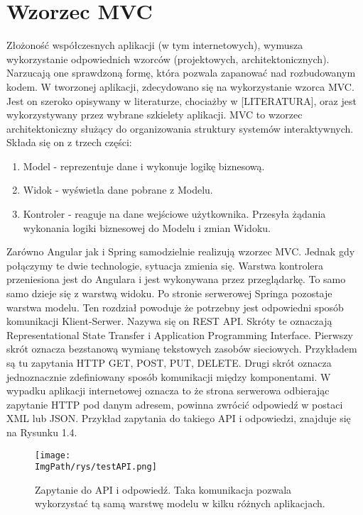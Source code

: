\documentclass[a4paper,12pt,twoside,openany]{report}
\newcommand{\ImgPath}{.}
\begin{document}
\section{Wzorzec MVC}
Złożoność współczesnych aplikacji (w tym internetowych), wymusza wykorzystanie odpowiednich wzorców (projektowych, architektonicznych). Narzucają one sprawdzoną formę, która pozwala zapanować nad rozbudowanym kodem. W tworzonej aplikacji, zdecydowano się na wykorzystanie wzorca MVC. Jest on szeroko opisywany w literaturze, chociażby w [LITERATURA], oraz jest wykorzystywany przez wybrane szkielety aplikacji. MVC to wzorzec architektoniczny służący do organizowania struktury systemów interaktywnych. Składa się on z trzech części:
	\begin{enumerate}
		\item Model - reprezentuje dane i wykonuje logikę biznesową.
		\item Widok - wyświetla dane pobrane z Modelu.
		\item Kontroler - reaguje na dane wejściowe użytkownika. Przesyła żądania wykonania logiki biznesowej do Modelu i zmian Widoku. 
	\end{enumerate}
Zarówno Angular jak i Spring samodzielnie realizują wzorzec MVC. Jednak gdy połączymy te dwie technologie, sytuacja zmienia się. Warstwa kontrolera przeniesiona jest do Angulara i jest wykonywana przez przeglądarkę. To samo samo dzieje się z warstwą widoku. Po stronie serwerowej Springa pozostaje warstwa modelu. Ten rozdział powoduje że potrzebny jest odpowiedni sposób komunikacji Klient-Serwer. Nazywa się on REST API. Skróty te oznaczają Representational State Transfer i Application Programming Interface. Pierwszy skrót oznacza bezstanową wymianę tekstowych zasobów sieciowych. Przykładem są tu zapytania HTTP GET, POST, PUT, DELETE. Drugi skrót oznacza jednoznacznie zdefiniowany sposób komunikacji między komponentami. W wypadku aplikacji internetowej oznacza to że strona serwerowa odbierając zapytanie HTTP pod danym adresem, powinna zwrócić odpowiedź w postaci XML lub JSON. Przykład zapytania do takiego API i odpowiedzi, znajduje się na Rysunku 1.4.
		\begin{figure}[!htbp]
			\begin{center}
				\centering
				\texttt{[image: \\ImgPath/rys/testAPI.png]}
			\end{center}
			\caption{Zapytanie do API i odpowiedź. Taka komunikacja pozwala wykorzystać tą samą warstwę modelu w kilku różnych aplikacjach.}
			\label{UMLTS}
		\end{figure}
\end{document}
